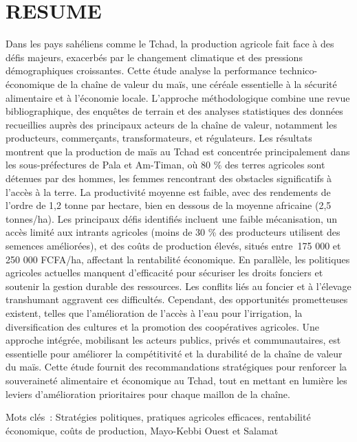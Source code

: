 \documentclass[12pt,oneside]{report}
\begin{document}
\chapter{RESUME}
Dans les pays sahéliens comme le Tchad, la production agricole fait face à des défis majeurs, exacerbés par le changement climatique et des pressions démographiques croissantes. Cette étude analyse la performance technico-économique de la chaîne de valeur du maïs, une céréale essentielle à la sécurité alimentaire et à l'économie locale. L'approche méthodologique combine une revue bibliographique, des enquêtes de terrain et des analyses statistiques des données recueillies auprès des principaux acteurs de la chaîne de valeur, notamment les producteurs, commerçants, transformateurs, et régulateurs. Les résultats montrent que la production de maïs au Tchad est concentrée principalement dans les sous-préfectures de Pala et Am-Timan, où 80 \% des terres agricoles sont détenues par des hommes, les femmes rencontrant des obstacles significatifs à l'accès à la terre. La productivité moyenne est faible, avec des rendements de l’ordre de 1,2 tonne par hectare, bien en dessous de la moyenne africaine (2,5 tonnes/ha). Les principaux défis identifiés incluent une faible mécanisation, un accès limité aux intrants agricoles (moins de 30 \% des producteurs utilisent des semences améliorées), et des coûts de production élevés, situés entre 175 000 et 250 000 FCFA/ha, affectant la rentabilité économique. En parallèle, les politiques agricoles actuelles manquent d'efficacité pour sécuriser les droits fonciers et soutenir la gestion durable des ressources. Les conflits liés au foncier et à l’élevage transhumant aggravent ces difficultés. Cependant, des opportunités prometteuses existent, telles que l'amélioration de l'accès à l'eau pour l'irrigation, la diversification des cultures et la promotion des coopératives agricoles. Une approche intégrée, mobilisant les acteurs publics, privés et communautaires, est essentielle pour améliorer la compétitivité et la durabilité de la chaîne de valeur du maïs. Cette étude fournit des recommandations stratégiques pour renforcer la souveraineté alimentaire et économique au Tchad, tout en mettant en lumière les leviers d'amélioration prioritaires pour chaque maillon de la chaîne.

Mots clés : Stratégies politiques, pratiques agricoles efficaces, rentabilité économique, coûts de production, Mayo-Kebbi Ouest et Salamat
\end{document}
